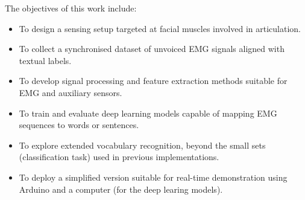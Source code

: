 The objectives of this work include:
\begin{itemize}
    \item To design a sensing setup targeted at facial muscles involved in articulation.
    \item To collect a synchronised dataset of unvoiced EMG signals aligned with textual labels.
    \item To develop signal processing and feature extraction methods suitable for EMG and auxiliary sensors.
    \item To train and evaluate deep learning models capable of mapping EMG sequences to words or sentences.
    \item To explore extended vocabulary recognition, beyond the small sets (classification task) used in previous implementations.
    \item To deploy a simplified version suitable for real-time demonstration using Arduino and a computer (for the deep learing models).
\end{itemize}
